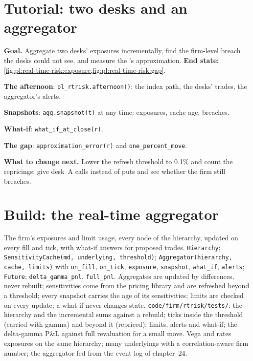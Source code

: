 \section{Tutorial: two desks and an aggregator}\label{tut:pl:real-time-risk:tut}

\begin{tutorial}
\textbf{Goal.} Aggregate two desks' exposures incrementally, find the firm-level breach the desks could not see, and measure the 's approximation. \textbf{End state:} \cref{fig:pl:real-time-risk:exposure,fig:pl:real-time-risk:gap}.
\begin{tutsteps}
\item \textbf{The afternoon}: \texttt{pl\_rtrisk.afternoon()}: the index path, the desks' trades, the aggregator's alerts.
\item \textbf{Snapshots}: \texttt{agg.snapshot(t)} at any time: exposures, cache age, breaches.
\item \textbf{What-if}: \texttt{what\_if\_at\_close(r)}.
\item \textbf{The gap}: \texttt{approximation\_error(r)} and \texttt{one\_percent\_move}.
\end{tutsteps}
\textbf{What to change next.} Lower the refresh threshold to 0.1\% and count the repricings; give desk~A calls instead of puts and see whether
the firm still breaches.
\end{tutorial}

\section{Build: the real-time aggregator}\label{bld:pl:real-time-risk:rtrisk}

\begin{build}
 The firm's exposures and limit usage, every node of the hierarchy, updated on every fill and tick, with what-if answers for
proposed trades.
 \texttt{Hierarchy}; \texttt{SensitivityCache(md, underlying, threshold)}; \texttt{Aggregator(hierarchy, cache,
limits)} with \texttt{on\_fill}, \texttt{on\_tick}, \texttt{exposure}, \texttt{snapshot}, \texttt{what\_if}, \texttt{alerts};
\texttt{Future}; \texttt{delta\_gamma\_pnl}, \texttt{full\_pnl}.
 Aggregates are updated by differences, never rebuilt; sensitivities come from the pricing library and are refreshed beyond a
threshold; every snapshot carries the age of its sensitivities; limits are checked on every update; a what-if never changes state.
 \texttt{code/firm/rtrisk/tests/}: the hierarchy and the incremental sums against a rebuild; ticks inside the
threshold (carried with gamma) and beyond it (repriced); limits, alerts and what-if; the delta-gamma P\&L against full revaluation for a small
move.
 Vega and rates exposures on the same hierarchy; many underlyings with a correlation-aware firm number; the aggregator fed
from the event log of chapter~24.
\end{build}

